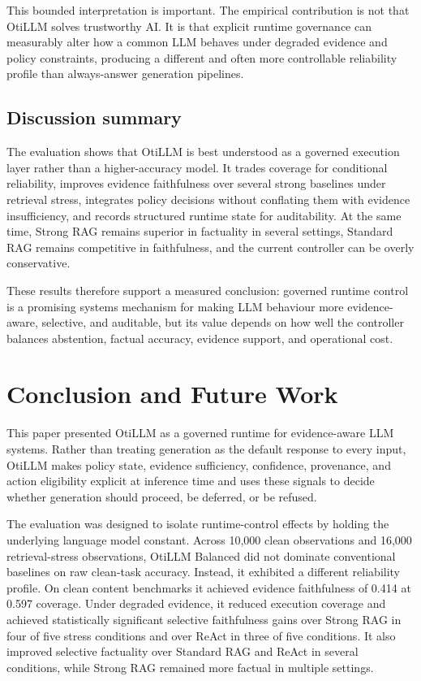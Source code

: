 \documentclass[manuscript, screen, review]{jair}
\begin{document}
This bounded interpretation is important. The empirical contribution is not that OtiLLM solves trustworthy AI. It is that explicit runtime governance can measurably alter how a common LLM behaves under degraded evidence and policy constraints, producing a different and often more controllable reliability profile than always-answer generation pipelines.

\subsection{Discussion summary}

The evaluation shows that OtiLLM is best understood as a governed execution layer rather than a higher-accuracy model. It trades coverage for conditional reliability, improves evidence faithfulness over several strong baselines under retrieval stress, integrates policy decisions without conflating them with evidence insufficiency, and records structured runtime state for auditability. At the same time, Strong RAG remains superior in factuality in several settings, Standard RAG remains competitive in faithfulness, and the current controller can be overly conservative.

These results therefore support a measured conclusion: governed runtime control is a promising systems mechanism for making LLM behaviour more evidence-aware, selective, and auditable, but its value depends on how well the controller balances abstention, factual accuracy, evidence support, and operational cost.

\section{Conclusion and Future Work}

This paper presented OtiLLM as a governed runtime for evidence-aware LLM
systems. Rather than treating generation as the default response to every
input, OtiLLM makes policy state, evidence sufficiency, confidence, provenance,
and action eligibility explicit at inference time and uses these signals to
decide whether generation should proceed, be deferred, or be refused.

The evaluation was designed to isolate runtime-control effects by holding the
underlying language model constant. Across 10,000 clean observations and
16,000 retrieval-stress observations, OtiLLM Balanced did not dominate
conventional baselines on raw clean-task accuracy. Instead, it exhibited a
different reliability profile. On clean content benchmarks it achieved
evidence faithfulness of 0.414 at 0.597 coverage. Under degraded evidence, it
reduced execution coverage and achieved statistically significant selective
faithfulness gains over Strong RAG in four of five stress conditions and over
ReAct in three of five conditions. It also improved selective factuality over
Standard RAG and ReAct in several conditions, while Strong RAG remained more
factual in multiple settings.
\end{document}
